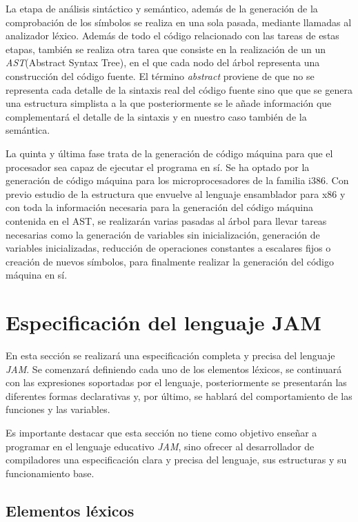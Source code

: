 \documentclass[a4paper,10pt]{article}
\begin{document}
La etapa de análisis sintáctico y semántico, además de la generación de la comprobación de los símbolos se realiza en una sola pasada, mediante llamadas al analizador léxico. Además de todo el código relacionado con las tareas de estas etapas, también se realiza otra tarea que consiste en la realización de un  un \textit{AST}(Abstract Syntax Tree), en el que cada nodo del árbol representa una construcción del código fuente. El término \textit{abstract} proviene de que no se representa cada detalle de la sintaxis real del código fuente sino que que se genera una estructura simplista a la que posteriormente se le añade información que complementará el detalle de la sintaxis y en nuestro caso también de la semántica. 

La quinta y última fase trata de la generación de código máquina para que el procesador sea capaz de ejecutar el programa en sí. Se ha optado por la generación de código máquina para los microprocesadores de la familia i386. Con previo estudio de la estructura que envuelve al lenguaje ensamblador para x86 y con toda la información necesaria para la generación del código máquina contenida en el AST, se realizarán varias pasadas al árbol para llevar tareas necesarias como la generación de variables sin inicialización, generación de variables inicializadas, reducción de operaciones constantes a escalares fijos o creación de nuevos símbolos, para finalmente realizar la generación del código máquina en sí. 

\section{Especificación del lenguaje JAM}
En esta sección se realizará una especificación completa y precisa del lenguaje \textit{JAM}. Se comenzará definiendo cada uno de los elementos léxicos, se continuará con las expresiones soportadas por el lenguaje, posteriormente se presentarán las diferentes formas declarativas y, por último, se hablará del comportamiento de las funciones y las variables.

Es importante destacar que esta sección no tiene como objetivo enseñar a programar en el lenguaje educativo \textit{JAM}, sino ofrecer al desarrollador de compiladores una especificación clara y precisa del lenguaje, sus estructuras y su funcionamiento base.

\subsection{Elementos léxicos}
\end{document}
